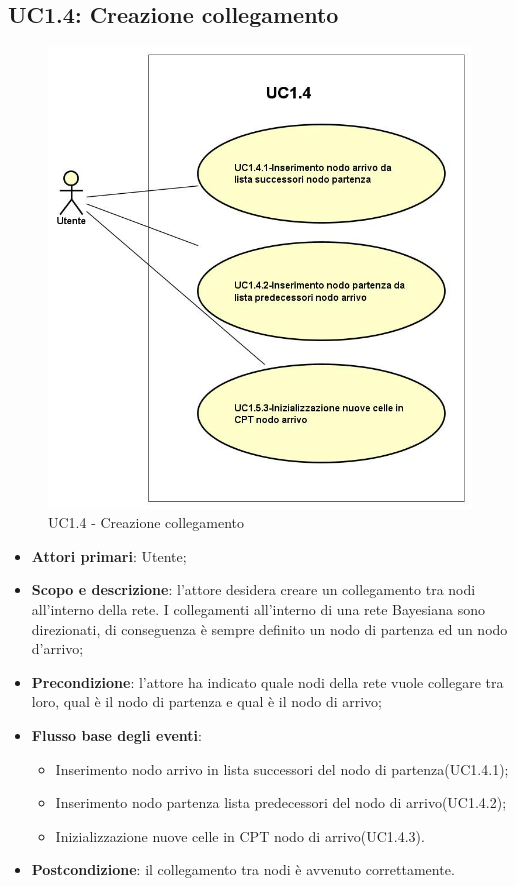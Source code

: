\subsection{UC1.4: Creazione collegamento} 
\hypertarget{UC1.4}{} 
\begin{figure} [H]
	\centering
	\includegraphics[scale=0.45]{Img/UC1-4} 
	\caption{UC1.4 - Creazione collegamento} \label{} 
\end{figure} 
\begin{itemize} 
	\item{\textbf{Attori primari}: Utente;} 
	\item{\textbf{Scopo e descrizione}: l'attore desidera creare un collegamento tra nodi all'interno della rete. I collegamenti all'interno di una rete Bayesiana sono direzionati, di conseguenza è sempre definito un nodo di partenza ed un nodo d'arrivo;} 
	\item{\textbf{Precondizione}: l'attore ha indicato quale nodi della rete vuole collegare tra loro, qual è il nodo di partenza e qual è il nodo di arrivo;} 
	\item{\textbf{Flusso base degli eventi}: } 
	\begin{itemize} 
		\item{Inserimento nodo arrivo in lista successori del nodo di partenza(UC1.4.1);} 
		\item{Inserimento nodo partenza lista predecessori del nodo di arrivo(UC1.4.2);} 
		\item{Inizializzazione nuove celle in CPT nodo di arrivo(UC1.4.3).} 
	\end{itemize} 
	\item{\textbf{Postcondizione}: il collegamento tra nodi è avvenuto correttamente.} 
\end{itemize} 
